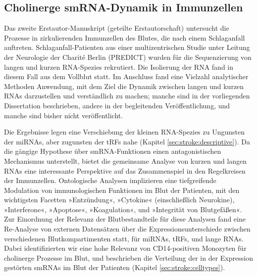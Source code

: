 \subsection{Cholinerge smRNA-Dynamik in Immunzellen}
Das zweite Erstautor-Manuskript (geteilte Erstautorschaft) untersucht die Prozesse in zirkulierenden Immunzellen des Blutes, die nach einem Schlaganfall auftreten.\cite{Winek2020} Schlaganfall-Patienten aus einer multizentrischen Studie unter Leitung der Neurologie der Charité Berlin (PREDICT\cite{Hoffmann2017}) wurden für die Sequenzierung von langen und kurzen RNA-Spezies rekrutiert. Die Isolierung der RNA fand in diesem Fall aus dem Vollblut statt. Im Anschluss fand eine Vielzahl analytischer Methoden Anwendung, mit dem Ziel die Dynamik zwischen langen und kurzen RNAs darzustellen und verständlich zu machen; manche sind in der vorliegenden Dissertation beschrieben, andere in der begleitenden Veröffentlichung, und manche sind bisher nicht veröffentlicht.

Die Ergebnisse legen eine Verschiebung der kleinen RNA-Spezies zu Ungunsten der miRNAs, aber zugunsten der tRFs nahe (Kapitel \ref{sec:stroke:descriptive}). Da die gängige Hypothese über smRNA-Funktionen einen antagonistischen Mechanismus unterstellt, bietet die gemeinsame Analyse von kurzen und langen RNAs eine interessante Perspektive auf das Zusammenspiel in den Regelkreisen der Immunzellen. Ontologische Analysen implizieren eine tiefgreifende Modulation von immunologischen Funktionen im Blut der Patienten, mit den wichtigsten Facetten »Entzündung«, »Cytokine« (einschließlich Neurokine), »Interferone«, »Apoptose«, »Koagulation«, und »Integrität von Blutgefäßen«. Zur Einordnung der Relevanz der Blutbestandteile für diese Analysen fand eine Re-Analyse von externen Datensätzen über die Expressionsunterschiede zwischen verschiedenen Blutkompartimenten statt, für miRNAs, tRFs, und lange RNAs. Dabei identifizierten wir eine hohe Relevanz von CD14-positiven Monozyten für cholinerge Prozesse im Blut, und beschrieben die Verteilung der in der Expression gestörten smRNAs im Blut der Patienten (Kapitel \ref{sec:stroke:celltypes}).

